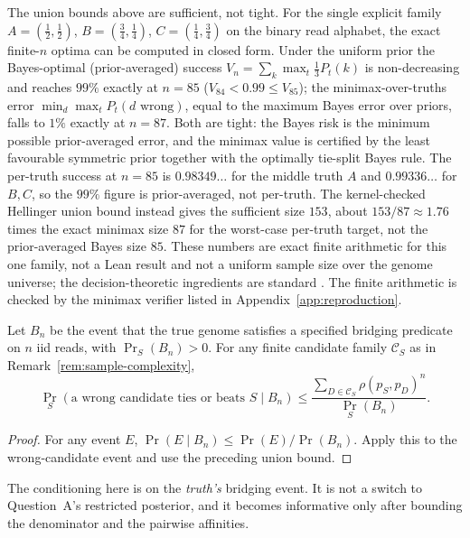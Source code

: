 \begin{remark}
\label{rem:minimax-sample-size}
The union bounds above are sufficient, not tight. For the single explicit
family $A=(\tfrac12,\tfrac12)$, $B=(\tfrac34,\tfrac14)$, $C=(\tfrac14,\tfrac34)$
on the binary read alphabet, the exact finite-$n$ optima can be computed in
closed form. Under the uniform prior the Bayes-optimal (prior-averaged) success
$V_n=\sum_k\max_t\tfrac13 P_t(k)$ is non-decreasing and reaches $99\%$ exactly
at $n=85$ ($V_{84}<0.99\le V_{85}$); the minimax-over-truths error
$\min_d\max_t P_t(d\text{ wrong})$, equal to the maximum Bayes error over
priors, falls to $1\%$ exactly at $n=87$. Both are tight: the Bayes risk is the
minimum possible prior-averaged error, and the minimax value is certified by
the least favourable symmetric prior together with the optimally tie-split
Bayes rule. The per-truth success at $n=85$ is $0.98349\ldots$ for the middle
truth $A$ and $0.99336\ldots$ for $B,C$, so the $99\%$ figure is prior-averaged,
not per-truth. The kernel-checked Hellinger union bound instead gives the
sufficient size $153$, about $153/87\approx1.76$ times the exact minimax size $87$ for the worst-case per-truth target, not the prior-averaged Bayes size $85$. These numbers are
exact finite arithmetic for this one family, not a Lean result and not a
uniform sample size over the genome universe; the decision-theoretic
ingredients are standard \parencite{berger1985,lehmann1998}. The finite arithmetic is checked by the minimax verifier
listed in Appendix~\ref{app:reproduction}.
\end{remark}

\begin{corollary}
\label{cor:conditional-bridging-error}
Let $B_n$ be the event that the true genome satisfies a specified bridging
predicate on $n$ iid reads, with $\Pr_S(B_n)>0$. For any finite candidate
family $\mathcal C_S$ as in Remark~\ref{rem:sample-complexity},
\[
 \Pr_S(\text{a wrong candidate ties or beats }S\mid B_n)
 \le
 \frac{\sum_{D\in\mathcal C_S}\rho(p_S,p_D)^n}
      {\Pr_S(B_n)}.
\]
\end{corollary}
\begin{proof}
For any event $E$, $\Pr(E\mid B_n)\le\Pr(E)/\Pr(B_n)$.
Apply this to the wrong-candidate event and use the preceding union bound.
\end{proof}
The conditioning here is on the \emph{truth's} bridging event. It is not
a switch to Question~A's restricted posterior, and it becomes informative
only after bounding the denominator and the pairwise affinities.
